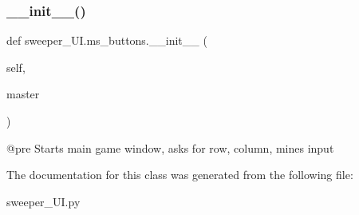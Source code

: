 \subsubsection{\texorpdfstring{\+\_\+\+\_\+init\+\_\+\+\_\+()}{\_\_init\_\_()}}
{\footnotesize\ttfamily def sweeper\+\_\+\+U\+I.\+ms\+\_\+buttons.\+\_\+\+\_\+init\+\_\+\+\_\+ (\begin{DoxyParamCaption}\item[{}]{self,  }\item[{}]{master }\end{DoxyParamCaption})}

\begin{DoxyVerb}@pre Starts main game window, asks for row, column, mines input
\end{DoxyVerb}
 

The documentation for this class was generated from the following file\+:\begin{DoxyCompactItemize}
\item 
sweeper\+\_\+\+U\+I.\+py\end{DoxyCompactItemize}
